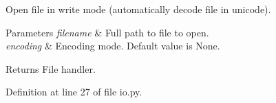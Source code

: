 Open file in write mode (automatically decode file in unicode). 


\begin{DoxyParams}{Parameters}
{\em filename} & Full path to file to open. \\
\hline
{\em encoding} & Encoding mode. Default value is None. \\
\hline
\end{DoxyParams}
\begin{DoxyReturn}{Returns}
File handler. 
\end{DoxyReturn}


Definition at line 27 of file io.\+py.

